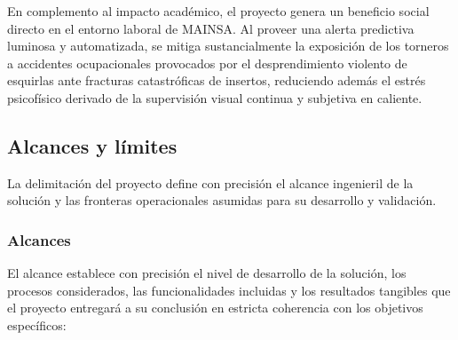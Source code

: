 En complemento al impacto académico, el proyecto genera un beneficio social directo en el entorno laboral de MAINSA. Al proveer una alerta predictiva luminosa y automatizada, se mitiga sustancialmente la exposición de los torneros a accidentes ocupacionales provocados por el desprendimiento violento de esquirlas ante fracturas catastróficas de insertos, reduciendo además el estrés psicofísico derivado de la supervisión visual continua y subjetiva en caliente.

\subsection{Alcances y límites}
\label{subsec:alcances_limites}

La delimitación del proyecto define con precisión el alcance ingenieril de la solución y las fronteras operacionales asumidas para su desarrollo y validación.

\subsubsection{Alcances}
\label{subsubsec:alcances}

El alcance establece con precisión el nivel de desarrollo de la solución, los procesos considerados, las funcionalidades incluidas y los resultados tangibles que el proyecto entregará a su conclusión en estricta coherencia con los objetivos específicos:

